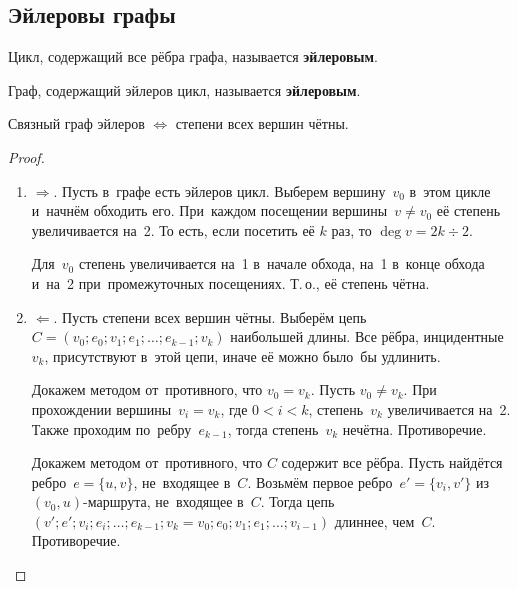 \subsection{Эйлеровы графы}
Цикл, содержащий все рёбра графа, называется \textbf{эйлеровым}.

Граф, содержащий эйлеров цикл, называется \textbf{эйлеровым}.

\begin{theorem}
Связный граф эйлеров $\Leftrightarrow$ степени всех вершин чётны.
\end{theorem}
\begin{proof}
\begin{enumerate}
	\item $\Rightarrow$. Пусть в~графе есть эйлеров цикл.
	Выберем вершину~$v_0$ в~этом цикле и~начнём обходить его.
	При~каждом посещении вершины~$v \neq v_0$ её степень увеличивается на~2.
	То есть, если посетить её $k$ раз, то $\deg v = 2k \div 2$.
	
	Для~$v_0$ степень увеличивается на~1 в~начале обхода, на~1 в~конце обхода и~на~2 при~промежуточных посещениях.
	Т.\,о., её степень чётна.
	
	\item $\Leftarrow$. Пусть степени всех вершин чётны.
	Выберём цепь~$C = (v_0; e_0; v_1; e_1; \ldots; e_{k-1}; v_k)$ наибольшей длины.
	Все рёбра, инцидентные~$v_k$, присутствуют в~этой цепи, иначе её можно было~бы удлинить.
	
	Докажем методом от~противного, что $v_0 = v_k$.
	Пусть $v_0 \neq v_k$.
	При прохождении вершины~$v_i = v_k$, где $0 < i < k$, степень~$v_k$ увеличивается на~2.
	Также проходим по~ребру~$e_{k-1}$, тогда степень~$v_k$ нечётна.
	Противоречие.
	
	Докажем методом от~противного, что $C$ содержит все рёбра.	
	Пусть найдётся ребро~$e = \{ u, v \}$, не~входящее в~$C$.
	Возьмём первое ребро~$e' = \{ v_i, v' \}$ из~$(v_0, u)$\nobreakdash-\hspace{0pt}маршрута, не~входящее в~$C$.
	Тогда цепь~$(v'; e'; v_i; e_i; \ldots; e_{k-1}; v_k = v_0; e_0; v_1; e_1; \ldots; v_{i-1})$ длиннее, чем~$C$.
	Противоречие.
\end{enumerate}
\end{proof}

